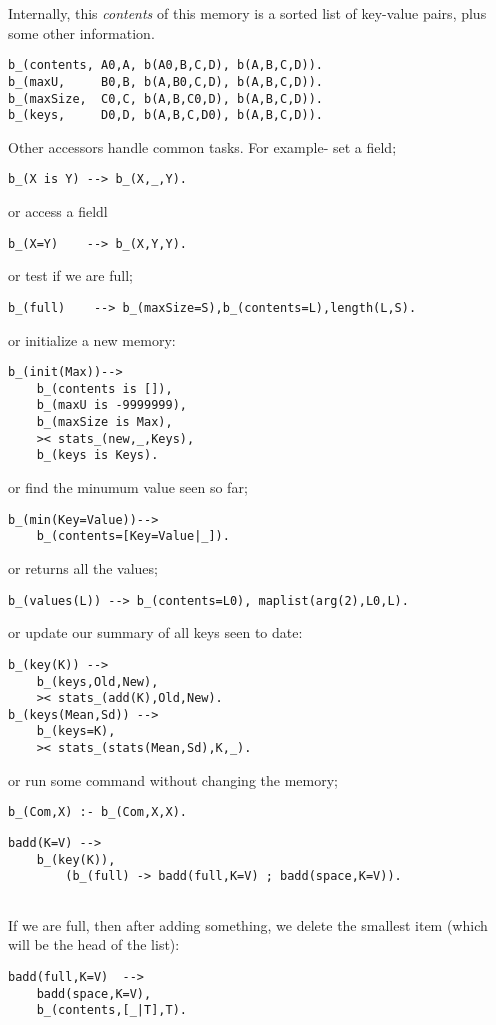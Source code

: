 Internally, this {\em contents} of this
memory is a sorted list of key-value pairs, plus
some other information.

\begin{Verbatim}
b_(contents, A0,A, b(A0,B,C,D), b(A,B,C,D)).
b_(maxU,     B0,B, b(A,B0,C,D), b(A,B,C,D)).
b_(maxSize,  C0,C, b(A,B,C0,D), b(A,B,C,D)).
b_(keys,     D0,D, b(A,B,C,D0), b(A,B,C,D)).
\end{Verbatim}
Other accessors handle common tasks.
For example- set a field;
\begin{Verbatim}
b_(X is Y) --> b_(X,_,Y).
\end{Verbatim}
or access a fieldl
\begin{Verbatim}
b_(X=Y)    --> b_(X,Y,Y).
\end{Verbatim}
or test if we are full;
\begin{Verbatim}
b_(full)    --> b_(maxSize=S),b_(contents=L),length(L,S).
\end{Verbatim}
or initialize a new memory:
\begin{Verbatim}
b_(init(Max))-->
	b_(contents is []),
	b_(maxU is -9999999),
	b_(maxSize is Max),
	>< stats_(new,_,Keys),
	b_(keys is Keys).
\end{Verbatim}
or find the minumum value seen so far;
\begin{Verbatim}
b_(min(Key=Value))-->
	b_(contents=[Key=Value|_]).
\end{Verbatim}
or returns all the values;
\begin{Verbatim}
b_(values(L)) --> b_(contents=L0), maplist(arg(2),L0,L).
\end{Verbatim}
or update our summary of all keys seen to date:
\begin{Verbatim}
b_(key(K)) -->
	b_(keys,Old,New),
	>< stats_(add(K),Old,New).
b_(keys(Mean,Sd)) -->
	b_(keys=K),
	>< stats_(stats(Mean,Sd),K,_).
\end{Verbatim}
or run some command without changing the memory;
\begin{Verbatim}
b_(Com,X) :- b_(Com,X,X).
\end{Verbatim}
\begin{Verbatim}
badd(K=V) -->
	b_(key(K)),
        (b_(full) -> badd(full,K=V) ; badd(space,K=V)).
	
\end{Verbatim}
If we are full, then after adding something, we delete the smallest item
(which will be the head of the list):
\begin{Verbatim}
badd(full,K=V)  -->
	badd(space,K=V),
	b_(contents,[_|T],T).
\end{Verbatim}
